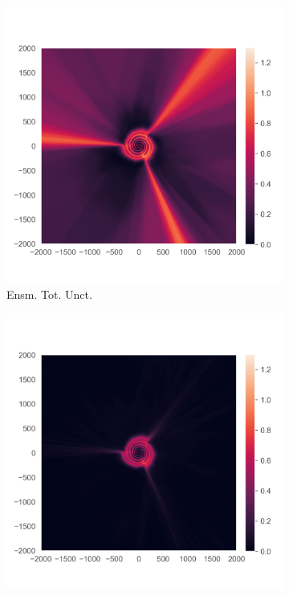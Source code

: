 \begin{figure}
\centering
\begin{subfigure}{0.22\textwidth}
  \centering
  \includegraphics[trim=42 45 15 55, clip, width=\linewidth]{../openreview/plots/3a.png}
  \caption{Ensm. Tot. Unct.}
  \label{fig:3a}
\end{subfigure}
\begin{subfigure}{0.22\textwidth}
  \centering
  \includegraphics[trim=42 45 15 55, clip, width=\linewidth]{../openreview/plots/3b.png}

\end{subfigure}
\end{figure}
